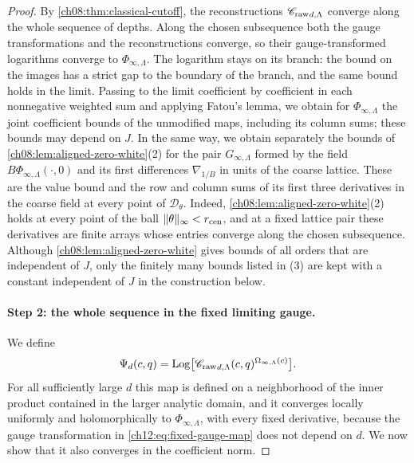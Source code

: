 \begin{proof}
By \cref{ch08:thm:classical-cutoff}, the reconstructions ${\mathscr C_{\mathrm{raw}}}_{d,\Lambda}$ converge along the whole sequence of depths. Along the chosen subsequence both the gauge transformations and the reconstructions converge, so their gauge-transformed logarithms converge to $\Phi_{\infty,\Lambda}$. The logarithm stays on its branch: the bound on the images has a strict gap to the boundary of the branch, and the same bound holds in the limit. Passing to the limit coefficient by coefficient in each nonnegative weighted sum and applying Fatou's lemma, we obtain for $\Phi_{\infty,\Lambda}$ the joint coefficient bounds of the unmodified maps, including its column sums; these bounds may depend on $J$. In the same way, we obtain separately the bounds of \cref{ch08:lem:aligned-zero-white}(2) for the pair $G_{\infty,\Lambda}$ formed by the field $B\Phi_{\infty,\Lambda}(\cdot,0)$ and its first differences $\nabla_{1/B}$ in units of the coarse lattice. These are the value bound and the row and column sums of its first three derivatives in the coarse field at every point of $\mathscr D_\theta$. Indeed, \cref{ch08:lem:aligned-zero-white}(2) holds at every point of the ball $\lVert \theta\rVert_\infty<r_{\mathrm{cen}}$, and at a fixed lattice pair these derivatives are finite arrays whose entries converge along the chosen subsequence. Although \cref{ch08:lem:aligned-zero-white} gives bounds of all orders that are independent of $J$, only the finitely many bounds listed in (3) are kept with a constant independent of $J$ in the construction below.

\paragraph{Step 2: the whole sequence in the fixed limiting gauge.}
We define
\begin{equation}
 \Psi_d(c,q)=\operatorname{Log}\bigl[{\mathscr C_{\mathrm{raw}}}_{d,\Lambda}(c,q)^{\Omega_{\infty,\Lambda}(c)}\bigr]. \label{ch12:eq:fixed-gauge-map}
\end{equation}
For all sufficiently large $d$ this map is defined on a neighborhood of the inner product contained in the larger analytic domain, and it converges locally uniformly and holomorphically to $\Phi_{\infty,\Lambda}$, with every fixed derivative, because the gauge transformation in \eqref{ch12:eq:fixed-gauge-map} does not depend on $d$. We now show that it also converges in the coefficient norm.


\end{proof}
